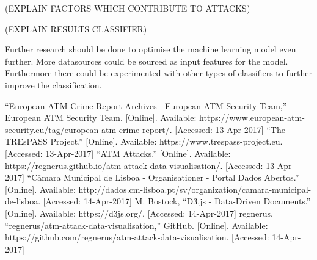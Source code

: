 \documentclass[conference]{IEEEtran}
\begin{document}
(EXPLAIN FACTORS WHICH CONTRIBUTE TO ATTACKS)

(EXPLAIN RESULTS CLASSIFIER)

Further research should be done to optimise the machine learning model even further. More datasources could be sourced as input features for the model. Furthermore there could be experimented with other types of classifiers to further improve the classification.




%
%
%
\begin{thebibliography}{1}

“European ATM Crime Report Archives | European ATM Security Team,” European ATM Security Team. [Online]. Available: https://www.european-atm-security.eu/tag/european-atm-crime-report/. [Accessed: 13-Apr-2017]
“The TREsPASS Project.” [Online]. Available: https://www.trespass-project.eu. [Accessed: 13-Apr-2017]
“ATM Attacks.” [Online]. Available: https://regnerus.github.io/atm-attack-data-visualisation/. [Accessed: 13-Apr-2017]
“Câmara Municipal de Lisboa - Organisationer - Portal Dados Abertos.” [Online]. Available: http://dados.cm-lisboa.pt/sv/organization/camara-municipal-de-lisboa. [Accessed: 14-Apr-2017]
M. Bostock, “D3.js - Data-Driven Documents.” [Online]. Available: https://d3js.org/. [Accessed: 14-Apr-2017]
regnerus, “regnerus/atm-attack-data-visualisation,” GitHub. [Online]. Available: https://github.com/regnerus/atm-attack-data-visualisation. [Accessed: 14-Apr-2017]


\end{thebibliography}




\end{document}
